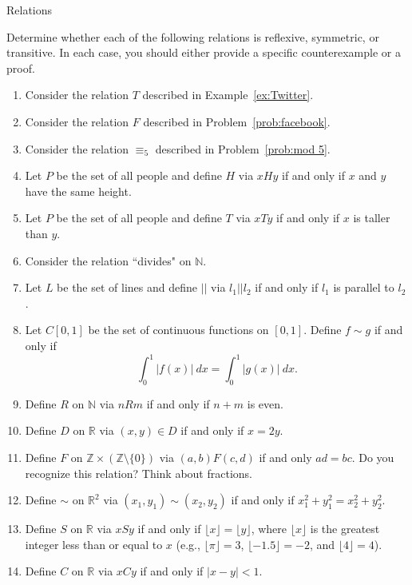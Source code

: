 \begin{section}{Relations}
\begin{problem}\label{prob:lots of relations}
Determine whether each of the following relations is reflexive, symmetric, or transitive. In each case, you should either provide a specific counterexample or a proof.
\begin{enumerate}[label=\textrm{(\alph*)}]
\item Consider the relation $T$ described in Example~\ref{ex:Twitter}.
\item Consider the relation $F$ described in Problem~\ref{prob:facebook}.
\item Consider the relation $\equiv_5$ described in Problem~\ref{prob:mod 5}.
\item Let $P$ be the set of all people and define $H$ via $xHy$ if and only if $x$ and $y$ have the same height.
\item Let $P$ be the set of all people and define $T$ via $xTy$ if and only if $x$ is taller than $y$.
\item Consider the relation ``divides" on $\mathbb{N}$.
\item Let $L$ be the set of lines and define $||$ via $l_1||l_2$ if and only if $l_1$ is parallel to $l_2$.
\item Let $C[0,1]$ be the set of continuous functions on $[0,1]$.  Define $f\sim g$ if and only if
\[
\int_0^1|f(x)|\ dx=\int_0^1|g(x)|\ dx.
\]
\item Define $R$ on $\mathbb{N}$ via $nR m$ if and only if $n+m$ is even.
\item Define $D$ on $\mathbb{R}$ via $(x,y)\in D$ if and only if $x=2y$.
\item Define $F$ on $\mathbb{Z}\times \left(\mathbb{Z}\setminus \{0\}\right)$ via $(a,b)F(c,d)$ if and only $ad=bc$. Do you recognize this relation? Think about fractions.
\item Define $\sim$ on $\mathbb{R}^2$ via $(x_1,y_1)\sim (x_2,y_2)$ if and only if $x_1^2+y_1^2=x_2^2+y_2^2$.
\item Define $S$ on $\mathbb{R}$ via $xS y$ if and only if $\lfloor x\rfloor =\lfloor y\rfloor$, where $\lfloor x\rfloor$ is the greatest integer less than or equal to $x$ (e.g., $\lfloor \pi\rfloor=3$, $\lfloor -1.5\rfloor=-2$, and $\lfloor 4\rfloor=4$).
\item Define $C$ on $\mathbb{R}$ via $xCy$ if and only if $|x-y|<1$.
\end{enumerate}
\end{problem}

\end{section}